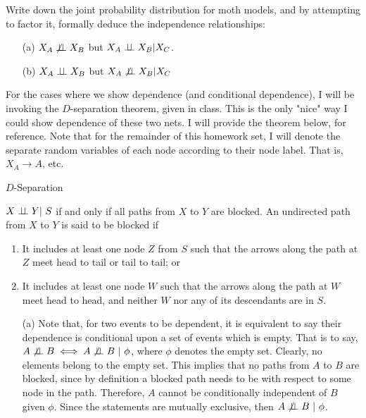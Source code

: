 Write down the joint probability distribution for moth models, and by attempting to factor it, formally deduce the independence relationships:
\begin{itemize}
    \item[(a)] $X_A \not \independent X_B$ but $X_A \independent X_B | X_C$.
    \item[(b)] $X_A \independent X_B$ but $X_A \not \independent X_B | X_C$
\end{itemize}
\partbreak
\begin{solution}

        For the cases where we show dependence (and conditional dependence), I will be invoking the $D$-separation theorem, given in class. This is the only "nice" way I could show dependence of these two nets. I will provide the theorem below, for reference. Note that for the remainder of this homework set, I will denote the separate random variables of each node according to their node label. That is, $X_A \to A$, etc.   

        \hop\begin{boxedquote}{$D$-Separation}{
        
        $X \independent Y | \ S$ if and only if all paths from $X$ to $Y$ are blocked. An undirected path from $X$ to $Y$ is said to be blocked if 
        \begin{enumerate}
            \item It includes at least one node $Z$ from $S$ such that the arrows along the path at $Z$ meet head to tail or tail to tail; or
            \item It includes at least one node $W$ such that the arrows along the path at $W$ meet head to head, and neither $W$ nor any of its descendants are in $S$.  
        \end{enumerate}
        \jump
        }    
        \end{boxedquote}
        \begin{itemize}
            \item[(a)] Note that, for two events to be dependent, it is equivalent to say their dependence is conditional upon a set of events which is empty. That is to say, $A \not\independent B \iff A\not\independent B  \ | \ \phi$, where $\phi$ denotes the empty set. Clearly, no elements belong to the empty set. This implies that no paths from $A$ to $B$ are blocked, since by definition a blocked path needs to be with respect to some node in the path. Therefore, $A$ cannot be conditionally independent of $B$ given $\phi$. Since the statements are mutually exclusive, then $A \not \independent B \ | \ \phi$. 


\end{itemize}
\end{solution}

